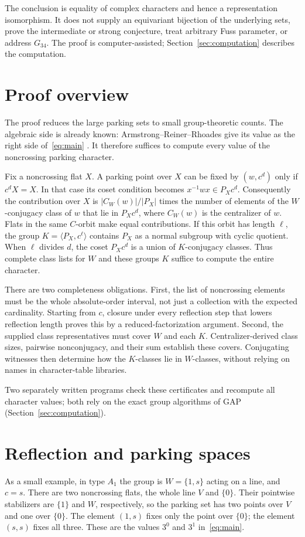 \documentclass[11pt]{article}
\begin{document}
The conclusion is equality of complex characters and hence a
representation isomorphism. It does not supply an equivariant bijection
of the underlying sets, prove the intermediate or strong conjecture,
treat arbitrary Fuss parameter, or address $G_{34}$. The proof is
computer-assisted; Section~\ref{sec:computation} describes the
computation.

\section{Proof overview}\label{sec:overview}
The proof reduces the large parking sets to small group-theoretic
counts. The algebraic side is already known: Armstrong--Reiner--Rhoades
give its value as the right side of~\eqref{eq:main}
\cite[Proposition~2.15]{ARR}. It therefore suffices to compute every
value of the noncrossing parking character.

Fix a noncrossing flat $X$. A parking point over $X$ can be fixed by
$(w,c^d)$ only if $c^dX=X$. In that case its coset condition becomes
$x^{-1}wx\in P_Xc^d$. Consequently the contribution over $X$ is
$|C_W(w)|/|P_X|$ times the number of elements of the $W$-conjugacy
class of $w$ that lie in $P_Xc^d$, where $C_W(w)$ is the centralizer
of $w$. Flats in the same $C$-orbit make equal
contributions. If this orbit has length $\ell$, the group
$K=\langle P_X,c^\ell\rangle$ contains $P_X$ as a normal subgroup with
cyclic quotient. When $\ell$ divides $d$, the coset $P_Xc^d$ is a union of
$K$-conjugacy classes. Thus complete class lists for $W$ and these
groups $K$ suffice to compute the entire character.

There are two completeness obligations. First, the list of
noncrossing elements must be the whole absolute-order interval, not
just a collection with the expected cardinality. Starting from $c$,
closure under every reflection step that lowers reflection length
proves this by a reduced-factorization argument. Second, the supplied
class representatives must cover $W$ and each $K$. Centralizer-derived
class sizes, pairwise nonconjugacy, and their sum establish these
covers. Conjugating witnesses then determine how the $K$-classes lie in
$W$-classes, without relying on names in character-table libraries.

Two separately written programs check these certificates and
recompute all character values; both rely on the exact group algorithms
of GAP (Section~\ref{sec:computation}).

\section{Reflection and parking spaces}\label{sec:definitions}
As a small example, in type $A_1$ the group is $W=\{1,s\}$ acting on
a line, and $c=s$. There are two noncrossing flats, the whole line
$V$ and $\{0\}$. Their pointwise stabilizers are $\{1\}$ and $W$,
respectively, so the parking set has two points over $V$ and one over
$\{0\}$. The element $(1,s)$ fixes only the point over $\{0\}$;
the element $(s,s)$ fixes all three. These are the values $3^0$ and
$3^1$ in~\eqref{eq:main}.
\end{document}
